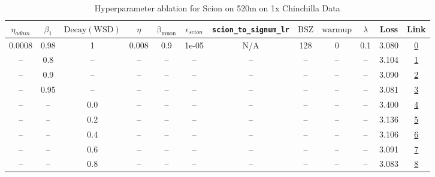 \begin{table}[H]
\centering
\caption{Hyperparameter ablation for Scion on 520m on 1x Chinchilla Data}
\label{tab:ablation_scion_520m_1}
\begin{tabular}{cccccccccccc}
\toprule
$\eta_{adam}$ & $\beta_1$ & $\mathrm{Decay (WSD)}$ & $\eta$ & $\mathrm{\beta_{muon}}$ & $\epsilon_{scion}$ & \texttt{scion\_to\_signum\_lr} & $\mathrm{BSZ}$ & $\mathrm{warmup}$ & $\lambda$ & Loss & Link \\
\midrule
0.0008 & 0.98 & 1 & 0.008 & 0.9 & 1e-05 & N/A & 128 & 0 & 0.1 & 3.080 & \href{https://wandb.ai/stanford-mercury/optimizer-scaling/runs/sweep-520m-10B-scioncff10blr0.008-wd0.1-minlr0-warmup0-b10.98-gn-c03799}{0} \\
\midrule
-- & 0.8 & -- & -- & -- & -- & -- & -- & -- & -- & 3.104 & \href{https://wandb.ai/stanford-mercury/optimizer-scaling/runs/sweep-520m-10B-scion6a83d1lr0.008-wd0.1-minlr0-warmup0-b10.8-gn2-b778f8}{1} \\
-- & 0.9 & -- & -- & -- & -- & -- & -- & -- & -- & 3.090 & \href{https://wandb.ai/stanford-mercury/optimizer-scaling/runs/sweep-520m-10B-scion8775a0lr0.008-wd0.1-minlr0-warmup0-b10.9-gn2-425030}{2} \\
-- & 0.95 & -- & -- & -- & -- & -- & -- & -- & -- & 3.081 & \href{https://wandb.ai/stanford-mercury/optimizer-scaling/runs/sweep-520m-10B-sciona6fcaalr0.008-wd0.1-minlr0-warmup0-b10.95-gn-87ceb2}{3} \\
-- & -- & 0.0 & -- & -- & -- & -- & -- & -- & -- & 3.400 & \href{https://wandb.ai/stanford-mercury/optimizer-scaling/runs/sweep-520m-10B-scion9ad7e2lr0.008-wd0.1-minlr0-warmup0-b10.98-gn-89f482}{4} \\
-- & -- & 0.2 & -- & -- & -- & -- & -- & -- & -- & 3.136 & \href{https://wandb.ai/stanford-mercury/optimizer-scaling/runs/sweep-520m-10B-scion31bf77lr0.008-wd0.1-minlr0-warmup0-b10.98-gn-df286d}{5} \\
-- & -- & 0.4 & -- & -- & -- & -- & -- & -- & -- & 3.106 & \href{https://wandb.ai/stanford-mercury/optimizer-scaling/runs/sweep-520m-10B-scionb32211lr0.008-wd0.1-minlr0-warmup0-b10.98-gn-7512f5}{6} \\
-- & -- & 0.6 & -- & -- & -- & -- & -- & -- & -- & 3.091 & \href{https://wandb.ai/stanford-mercury/optimizer-scaling/runs/sweep-520m-10B-scion8a4cf6lr0.008-wd0.1-minlr0-warmup0-b10.98-gn-6baf62}{7} \\
-- & -- & 0.8 & -- & -- & -- & -- & -- & -- & -- & 3.083 & \href{https://wandb.ai/stanford-mercury/optimizer-scaling/runs/sweep-520m-10B-scion71dd21lr0.008-wd0.1-minlr0-warmup0-b10.98-gn-26a277}{8} \\

\end{tabular}
\end{table}
